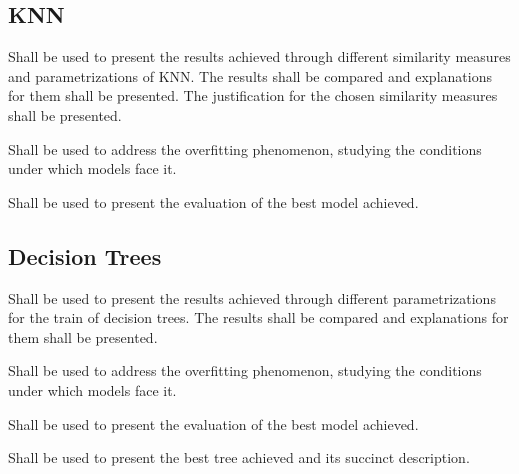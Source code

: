 \documentclass[11pt]{article}
\begin{document}

\subsection{KNN}
\begin{tcolorbox} %
Shall be used to present the results achieved through different similarity measures and parametrizations of KNN. The results shall be compared and explanations for them shall be presented. The justification for the chosen similarity measures shall be presented.
\end{tcolorbox} %
\begin{tcolorbox} %
Shall be used to address the overfitting phenomenon, studying the conditions under which models face it.
\end{tcolorbox} %
\begin{tcolorbox} %
Shall be used to present the evaluation of the best model achieved.
\end{tcolorbox} %


\subsection{Decision Trees}
\begin{tcolorbox} %
Shall be used to present the results achieved through different parametrizations for the train of decision trees. The results shall be compared and explanations for them shall be presented.
\end{tcolorbox} %
\begin{tcolorbox} %
Shall be used to address the overfitting phenomenon, studying the conditions under which models face it.
\end{tcolorbox} %
\begin{tcolorbox} %
Shall be used to present the evaluation of the best model achieved.
\end{tcolorbox} %
\begin{tcolorbox} %
Shall be used to present the best tree achieved and its succinct description.
\end{tcolorbox} %
\end{document}
